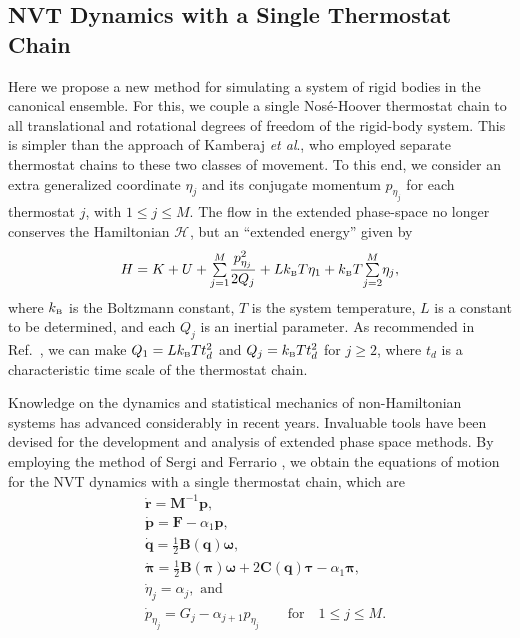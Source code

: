 \documentclass[
journal=jctcce,
layout=twocolumn
]{achemso}
\newcommand{\mt}[1]{\boldsymbol{\mathbf{#1}}}   %
\newcommand{\vt}[1]{\boldsymbol{\mathbf{#1}}}   %
\newcommand{\Ham}[1]{{\mathcal H}_\text{#1}}    %
\begin{document}
\subsection{NVT Dynamics with a Single Thermostat Chain}

Here we propose a new method for simulating a system of rigid bodies in the canonical ensemble.
For this, we couple a single Nos\'{e}-Hoover thermostat chain \cite{Martyna_1992} to all translational and rotational degrees of freedom of the rigid-body system.
This is simpler than the approach of Kamberaj \textit{et al}.,\cite{Kamberaj_2005} who employed separate thermostat chains to these two classes of movement.
To this end, we consider an extra generalized coordinate $\eta_j$ and its conjugate momentum $p_{\eta_j}$ for each thermostat $j$, with $1 \leq j \le M$.
The flow in the extended phase-space no longer conserves the Hamiltonian $\Ham{}$, but an ``extended energy'' given by \cite{Martyna_1992}
\begin{equation}
\label{eq:nvt extended energy}
H = K + U + {\textstyle\sum\limits_{j=1}^{M}} \frac{p_{\eta_j}^2}{2Q_j} + L k_\text{\tiny B} T\eta_1 + k_\text{\tiny B} T {\textstyle\sum\limits_{j=2}^{M}} \eta_j,
\end{equation}
where $k_\text{\tiny B}$ is the Boltzmann constant, $T$ is the system temperature, $L$ is a constant to be determined, and each $Q_j$ is an inertial parameter.
As recommended in Ref.~, we can make $Q_1 = L k_\text{\tiny B} T t_d^2$ and $Q_j = k_\text{\tiny B} T t_d^2$ for $j \geq 2$, where $t_d$ is a characteristic time scale of the thermostat chain.

Knowledge on the dynamics and statistical mechanics of non-Hamiltonian systems has advanced considerably in recent years.\cite{Tuckerman_1999, Tuckerman_2001, Sergi_2001, Sergi_2003, Ezra_2004, Sergi_2004, Ezra_2006, Sergi_2010_2} Invaluable tools have been devised for the development and analysis of extended phase space methods.
By employing the method of Sergi and Ferrario \cite{Sergi_2001}, we obtain the equations of motion for the NVT dynamics with a single thermostat chain, which are
\begin{subequations}
	\label{eq:ODE system for NVT}
	\begin{align}
%
\label{eq:nhc_r}
	&\dot{\vt r} =
	{\mt M}^{-1} {\vt p}, \\
%
\label{eq:nhc_p} 
	&\dot{\vt p} =
	{\vt F} - \alpha_1 {\vt p},\\
%
\label{eq:nhc_q}
	&\dot{\vt q} =
	\frac{1}{2} \mt B(\vt q) \vt \omega, \\
%
\label{eq:nhc_pi}
	&\dot{\vt \pi} =
	\frac{1}{2} \mt B(\vt \pi) \vt \omega + 2 \mt C(\vt q) \vt \tau - \alpha_1 {\vt \pi}, \\
%
\label{eq:nhc_eta}
	&\dot{\eta}_j = \alpha_j, \text{ and} \\
%
\label{eq:nhc_p_eta}
	&{\dot p}_{\eta_j} = G_j - \alpha_{j+1} p_{\eta_j} \qquad \text{for} \quad 1 \leq j \le M.
	\end{align}
\end{subequations}
\end{document}

